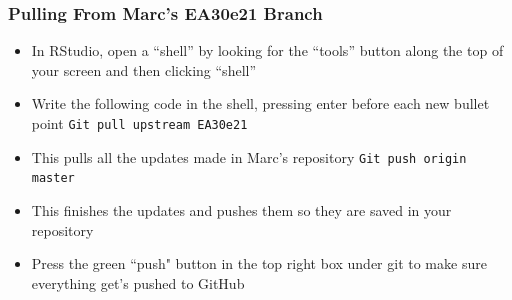 \documentclass[12pt]{../SOP4_alpha}
\begin{document}
\subsubsection{Pulling From Marc's EA30e21 Branch}

\begin{itemize}

\item In RStudio, open a ``shell'' by looking for the ``tools'' button along the top of your screen and then clicking ``shell''
\item Write the following code in the shell, pressing enter before each new bullet point 
  \indent\verb"Git pull upstream EA30e21"
    \item This pulls all the updates made in Marc’s repository
  \indent\verb"Git push origin master" 
    \item This finishes the updates and pushes them so they are saved in your repository
\item Press the green ``push" button in the top right box under git to make sure everything get’s pushed to GitHub
\end{itemize}
\end{document}
